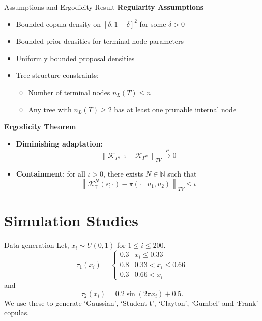 \documentclass[11pt]{beamer}
\begin{document}
\begin{frame}{Assumptions and Ergodicity Result}
\textbf{Regularity Assumptions}
\begin{itemize}
    \item Bounded copula density on $[\delta,1-\delta]^2$ for some $\delta>0$
    \item Bounded prior densities for terminal node parameters
    \item Uniformly bounded proposal densities
    \item Tree structure constraints:
    \begin{itemize}
        \item Number of terminal nodes $n_L(T) \le n$
        \item Any tree with $n_L(T) \ge 2$ has at least one prunable internal node
    \end{itemize}
\end{itemize}

\pause
\vspace{0.3cm}
\textbf{Ergodicity Theorem}
\begin{itemize}
    \item \textbf{Diminishing adaptation}:
    \[
        \left\|\mathcal{K}_{\Gamma^{\eta+1}} - \mathcal{K}_{\Gamma^{\eta}}\right\|_{TV}
        \xrightarrow{P} 0
    \]
    \item \textbf{Containment}: for all $\iota > 0$, there exists $N \in \mathbb{N}$ such that
    \[
        \left\|\mathcal{K}^N_{\gamma}(s;\cdot) - \pi(\cdot \mid u_1,u_2)\right\|_{TV}
        \le \iota
    \]
\end{itemize}


\end{frame}


    \section{Simulation Studies}

    \begin{frame}{Data generation}
        Let, $x_i\sim U(0,1)$ for $1\le i\le 200$. 
\begin{equation}\label{eq:tree:tau}
	\tau_1(x_i) = \begin{cases}
		0.3 & x_i \le 0.33\\
		0.8 & 0.33 < x_i \le 0.66\\
		0.3 & 0.66 < x_i
	\end{cases}
\end{equation}
and
\begin{equation}\label{eq:sin:tau}
	\tau_2(x_i) = 0.2\sin(2\pi x_i) + 0.5.
\end{equation}
We use these to generate `Gaussian', `Student-t', `Clayton', `Gumbel' and `Frank' copulas.
    \end{frame}
\end{document}
